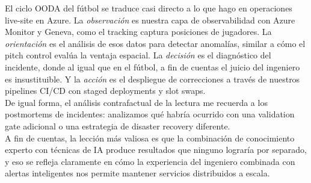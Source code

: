 \documentclass[12pt,a4paper]{article}
\begin{document}
El ciclo OODA del fútbol se traduce casi directo a lo que hago en operaciones live-site en Azure. La \textit{observación} es nuestra capa de observabilidad con Azure Monitor y Geneva, como el tracking captura posiciones de jugadores. La \textit{orientación} es el análisis de esos datos para detectar anomalías, similar a cómo el pitch control evalúa la ventaja espacial. La \textit{decisión} es el diagnóstico del incidente, donde al igual que en el fútbol, a fin de cuentas el juicio del ingeniero es insustituible. Y la \textit{acción} es el despliegue de correcciones a través de nuestros pipelines CI/CD con staged deployments y slot swaps.\\

De igual forma, el análisis contrafactual de la lectura me recuerda a los postmortems de incidentes: analizamos qué habría ocurrido con una validation gate adicional o una estrategia de disaster recovery diferente.\\

A fin de cuentas, la lección más valiosa es que la combinación de conocimiento experto con técnicas de IA produce resultados que ninguno lograría por separado, y eso se refleja claramente en cómo la experiencia del ingeniero combinada con alertas inteligentes nos permite mantener servicios distribuidos a escala.
\end{document}
